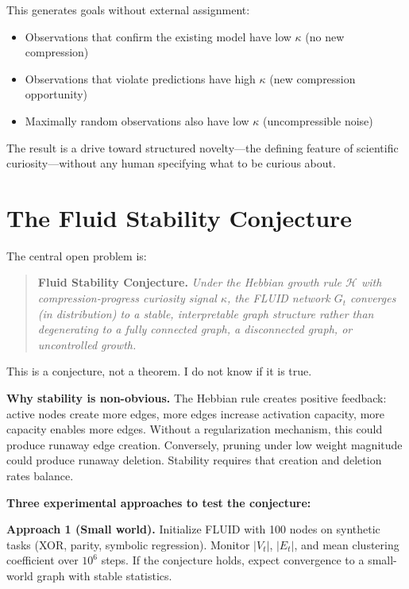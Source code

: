 \documentclass[12pt]{article}
\begin{document}
This generates goals without external assignment:
\begin{itemize}
    \item Observations that confirm the existing model have low $\kappa$ (no new compression)
    \item Observations that violate predictions have high $\kappa$ (new compression opportunity)
    \item Maximally random observations also have low $\kappa$ (uncompressible noise)
\end{itemize}

The result is a drive toward structured novelty---the defining feature of scientific curiosity---without any human specifying what to be curious about.

\section{The Fluid Stability Conjecture}
\label{sec:stability}

The central open problem is:

\begin{quote}
\textbf{Fluid Stability Conjecture.} \textit{Under the Hebbian growth rule $\mathcal{H}$ with compression-progress curiosity signal $\kappa$, the FLUID network $G_t$ converges (in distribution) to a stable, interpretable graph structure rather than degenerating to a fully connected graph, a disconnected graph, or uncontrolled growth.}
\end{quote}

This is a conjecture, not a theorem. I do not know if it is true.

\textbf{Why stability is non-obvious.} The Hebbian rule creates positive feedback: active nodes create more edges, more edges increase activation capacity, more capacity enables more edges. Without a regularization mechanism, this could produce runaway edge creation. Conversely, pruning under low weight magnitude could produce runaway deletion. Stability requires that creation and deletion rates balance.

\textbf{Three experimental approaches to test the conjecture:}

\textbf{Approach 1 (Small world).} Initialize FLUID with 100 nodes on synthetic tasks (XOR, parity, symbolic regression). Monitor $|V_t|$, $|E_t|$, and mean clustering coefficient over $10^6$ steps. If the conjecture holds, expect convergence to a small-world graph \cite{watts1998} with stable statistics.
\end{document}
